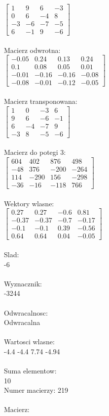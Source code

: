\documentclass[a4paper,12pt]{article}
\begin{document}
$\begin{bmatrix} 1&9&6&-3\\0&6&-4&8\\-3&-6&-7&-5\\6&-1&9&-6 \end{bmatrix}$
\\
\\
Macierz odwrotna:\\

$\begin{bmatrix} -0.05&0.24&0.13&0.24\\0.1&0.08&0.05&0.01\\-0.01&-0.16&-0.16&-0.08\\-0.08&-0.01&-0.12&-0.05 \end{bmatrix}$
\\
\\
Macierz transponowana:\\

$\begin{bmatrix} 1&0&-3&6\\9&6&-6&-1\\6&-4&-7&9\\-3&8&-5&-6 \end{bmatrix}$
\\
\\
Macierz do potegi 3:\\

$\begin{bmatrix} 604&402&876&498\\-48&376&-200&-264\\114&-290&156&-298\\-36&-16&-118&766 \end{bmatrix}$
\\
\\
Wektory wlasne:\\

$\begin{bmatrix} 0.27&0.27&-0.6&0.81\\-0.37&-0.37&-0.7&-0.17\\-0.1&-0.1&0.39&-0.56\\0.64&0.64&0.04&-0.05 \end{bmatrix}$
\\
\\
Slad:\\
-6
\\
\\
Wyznacznik:\\
-3244
\\
\\
Odwracalnosc:\\
Odwracalna
\\
\\
Wartosci wlasne:\\
-4.4 -4.4 7.74 -4.94
\\
\\
Suma elementow:\\
10
\\
\newpage
Numer macierzy:
219
\\
\\
Macierz:\\
\end{document}
